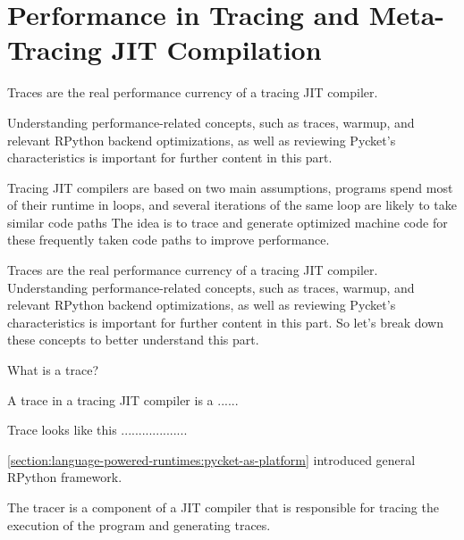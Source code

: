 \chapter{Performance in Tracing and Meta-Tracing JIT Compilation}

    \begin{chapterpoint}
        Traces are the real performance currency of a tracing JIT compiler.

        Understanding performance-related concepts, such as traces, warmup, and relevant RPython backend optimizations, as well as reviewing Pycket's characteristics is important for further content in this part.
    \end{chapterpoint}

    \begin{paragraph-here}
            Tracing JIT compilers are based on two main assumptions, programs spend most of their runtime in loops, and several iterations of the same loop are likely to take similar code paths \cite{pypy-main}
            The idea is to trace and generate optimized machine code for these frequently taken code paths to improve performance.
        \end{paragraph-here}

    \begin{paragraph-here}
        Traces are the real performance currency of a tracing JIT compiler.
        Understanding performance-related concepts, such as traces, warmup, and relevant RPython backend optimizations, as well as reviewing Pycket's characteristics is important for further content in this part.
        So let's break down these concepts to better understand this part.
    \end{paragraph-here}

    \begin{paragraph-here}
        What is a trace?

        A trace in a tracing JIT compiler is a ......
    \end{paragraph-here}

    \begin{paragraph-here}
        Trace looks like this ...................
    \end{paragraph-here}

    \begin{paragraph-here}
        \ref{section:language-powered-runtimes:pycket-as-platform} introduced general RPython framework.

        The tracer is a component of a JIT compiler that is responsible for tracing the execution of the program and generating traces.
    \end{paragraph-here}

